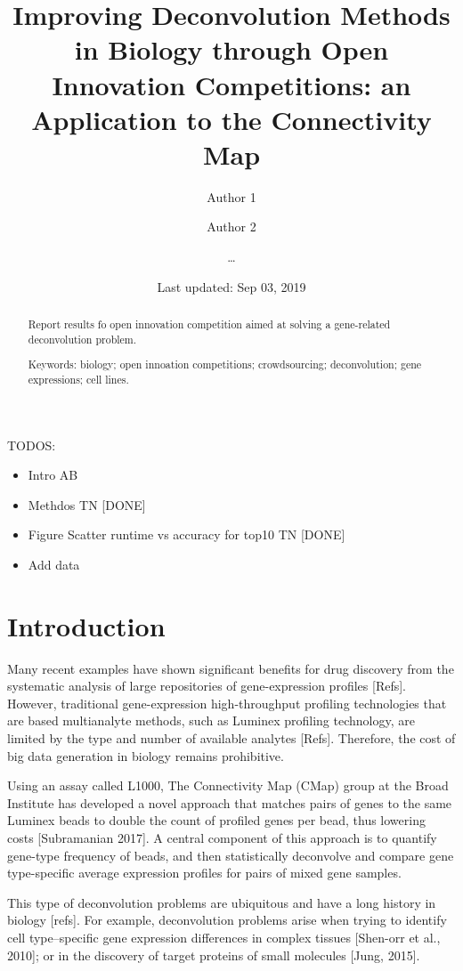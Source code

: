 \documentclass[]{article}
\title{Improving Deconvolution Methods in Biology through Open Innovation
Competitions: an Application to the Connectivity Map}
\author{Author 1 \and Author 2 \and \ldots{}}
\date{Last updated: Sep 03, 2019}
\providecommand{\tightlist}{%
  \setlength{\itemsep}{0pt}\setlength{\parskip}{0pt}}
\begin{document}
\maketitle
\begin{abstract}
Report results fo open innovation competition aimed at solving a
gene-related deconvolution problem.


\smallskip\noindent 
Keywords: biology; open innoation competitions; crowdsourcing; deconvolution; gene expressions; cell lines.
\end{abstract}

{
\setcounter{tocdepth}{2}
\newpage
\tableofcontents
\newpage
}
TODOS:

\begin{itemize}
\tightlist
\item
  Intro AB
\item
  Methdos TN {[}DONE{]}
\item
  Figure Scatter runtime vs accuracy for top10 TN {[}DONE{]}
\item
  Add data
\end{itemize}

\hypertarget{introduction}{%
\section{Introduction}\label{introduction}}

Many recent examples have shown significant benefits for drug discovery
from the systematic analysis of large repositories of gene-expression
profiles {[}Refs{]}. However, traditional gene-expression
high-throughput profiling technologies that are based multianalyte
methods, such as Luminex profiling technology, are limited by the type
and number of available analytes {[}Refs{]}. Therefore, the cost of big
data generation in biology remains prohibitive.

Using an assay called L1000, The Connectivity Map (CMap) group at the
Broad Institute has developed a novel approach that matches pairs of
genes to the same Luminex beads to double the count of profiled genes
per bead, thus lowering costs {[}Subramanian 2017{]}. A central
component of this approach is to quantify gene-type frequency of beads,
and then statistically deconvolve and compare gene type-specific average
expression profiles for pairs of mixed gene samples.

This type of deconvolution problems are ubiquitous and have a long
history in biology {[}refs{]}. For example, deconvolution problems arise
when trying to identify cell type--specific gene expression differences
in complex tissues {[}Shen-orr et al., 2010{]}; or in the discovery of
target proteins of small molecules {[}Jung, 2015{]}.
\end{document}
